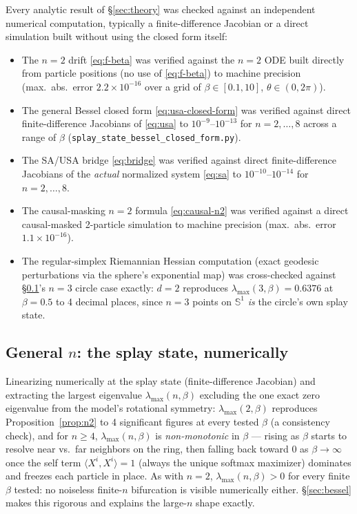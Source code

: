 \documentclass[11pt]{article}
\begin{document}
Every analytic result of \S\ref{sec:theory} was checked against an independent numerical computation, typically a finite-difference Jacobian or a direct simulation built without using the closed form itself:
\begin{itemize}[leftmargin=*]
    \item The $n=2$ drift \eqref{eq:f-beta} was verified against the $n=2$ ODE built directly from particle positions (no use of \eqref{eq:f-beta}) to machine precision (max.\ abs.\ error $2.2\times10^{-16}$ over a grid of $\beta\in[0.1,10]$, $\theta\in(0,2\pi)$).
    \item The general Bessel closed form \eqref{eq:usa-closed-form} was verified against direct finite-difference Jacobians of \eqref{eq:usa} to $10^{-9}$--$10^{-13}$ for $n=2,\dots,8$ across a range of $\beta$ (\texttt{splay\_state\_bessel\_closed\_form.py}).
    \item The SA/USA bridge \eqref{eq:bridge} was verified against direct finite-difference Jacobians of the \emph{actual} normalized system \eqref{eq:sa} to $10^{-10}$--$10^{-14}$ for $n=2,\dots,8$.
    \item The causal-masking $n=2$ formula \eqref{eq:causal-n2} was verified against a direct causal-masked 2-particle simulation to machine precision (max.\ abs.\ error $1.1\times10^{-16}$).
    \item The regular-simplex Riemannian Hessian computation (exact geodesic perturbations via the sphere's exponential map) was cross-checked against \S\ref{sec:general-n}'s $n=3$ circle case exactly: $d=2$ reproduces $\lambda_{\max}(3,\beta)=0.6376$ at $\beta=0.5$ to 4 decimal places, since $n=3$ points on $\mathbb{S}^1$ \emph{is} the circle's own splay state.
\end{itemize}

\subsection{General $n$: the splay state, numerically}
\label{sec:general-n}

Linearizing numerically at the splay state (finite-difference Jacobian) and extracting the largest eigenvalue $\lambda_{\max}(n,\beta)$ excluding the one exact zero eigenvalue from the model's rotational symmetry: $\lambda_{\max}(2,\beta)$ reproduces Proposition~\ref{prop:n2} to 4 significant figures at every tested $\beta$ (a consistency check), and for $n\ge4$, $\lambda_{\max}(n,\beta)$ is \emph{non-monotonic} in $\beta$ --- rising as $\beta$ starts to resolve near vs.\ far neighbors on the ring, then falling back toward 0 as $\beta\to\infty$ once the self term $\langle X^i,X^i\rangle=1$ (always the unique softmax maximizer) dominates and freezes each particle in place. As with $n=2$, $\lambda_{\max}(n,\beta)>0$ for every finite $\beta$ tested: no noiseless finite-$n$ bifurcation is visible numerically either. \S\ref{sec:bessel} makes this rigorous and explains the large-$n$ shape exactly.
\end{document}
